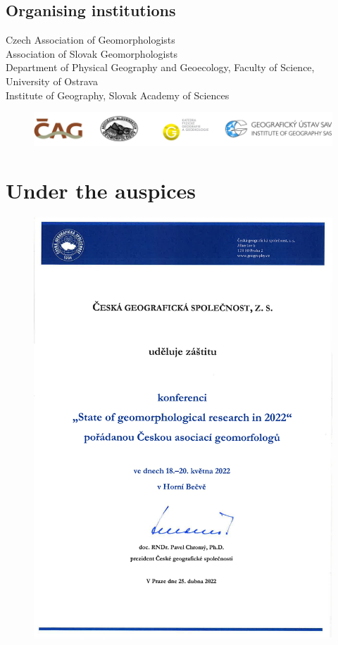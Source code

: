 \documentclass[
	openany, %
	parskip=false, %
	12pt, %
	a4paper, %
]{conferencebooklet} %
\begin{document}
\section{Organising institutions}
\noindent
Czech Association of Geomorphologists\\
Association of Slovak Geomorphologists\\
Department of Physical Geography and Geoecology, Faculty of Science, University of Ostrava\\
Institute of Geography, Slovak Academy of Sciences
\begin{figure}[h]
	\centering
	\includegraphics[width=1\linewidth]{images/geomorfologie-logolink}
\end{figure}

\chapter*{Under the auspices}
\begin{figure}[!htb]
	\centering
	\includegraphics[width=0.85\linewidth]{"images/logos/Partnerlogos/2022 04 25 záštita ČGS geomorfologové 1"}
\end{figure}
\end{document}
